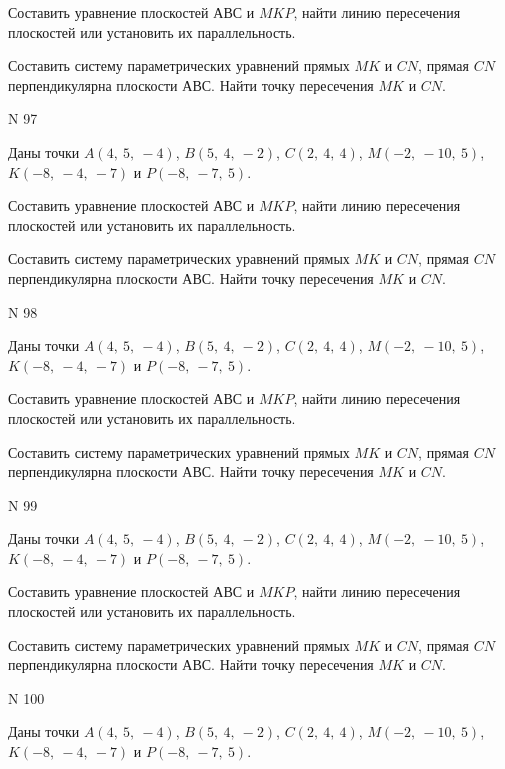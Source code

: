 \documentclass[11pt]{report}
\begin{document}
Составить уравнение плоскостей $АВС$ и $MKP$,
найти линию пересечения плоскостей или установить их параллельность.

Составить систему параметрических уравнений прямых $MK$ и $CN$,
прямая $CN$ перпендикулярна плоскости $АВС$. 
Найти точку пересечения $MK$ и $CN$.



 N 97

Даны точки $A\left( 4, \  5, \  -4\right)$, $B\left( 5, \  4, \  -2\right)$, $C\left( 2, \  4, \  4\right)$, $M\left( -2, \  -10, \  5\right)$, $K\left( -8, \  -4, \  -7\right)$ и $P\left( -8, \  -7, \  5\right)$.


Составить уравнение плоскостей $АВС$ и $MKP$,
найти линию пересечения плоскостей или установить их параллельность.

Составить систему параметрических уравнений прямых $MK$ и $CN$,
прямая $CN$ перпендикулярна плоскости $АВС$. 
Найти точку пересечения $MK$ и $CN$.



 N 98

Даны точки $A\left( 4, \  5, \  -4\right)$, $B\left( 5, \  4, \  -2\right)$, $C\left( 2, \  4, \  4\right)$, $M\left( -2, \  -10, \  5\right)$, $K\left( -8, \  -4, \  -7\right)$ и $P\left( -8, \  -7, \  5\right)$.


Составить уравнение плоскостей $АВС$ и $MKP$,
найти линию пересечения плоскостей или установить их параллельность.

Составить систему параметрических уравнений прямых $MK$ и $CN$,
прямая $CN$ перпендикулярна плоскости $АВС$. 
Найти точку пересечения $MK$ и $CN$.



 N 99

Даны точки $A\left( 4, \  5, \  -4\right)$, $B\left( 5, \  4, \  -2\right)$, $C\left( 2, \  4, \  4\right)$, $M\left( -2, \  -10, \  5\right)$, $K\left( -8, \  -4, \  -7\right)$ и $P\left( -8, \  -7, \  5\right)$.


Составить уравнение плоскостей $АВС$ и $MKP$,
найти линию пересечения плоскостей или установить их параллельность.

Составить систему параметрических уравнений прямых $MK$ и $CN$,
прямая $CN$ перпендикулярна плоскости $АВС$. 
Найти точку пересечения $MK$ и $CN$.



 N 100

Даны точки $A\left( 4, \  5, \  -4\right)$, $B\left( 5, \  4, \  -2\right)$, $C\left( 2, \  4, \  4\right)$, $M\left( -2, \  -10, \  5\right)$, $K\left( -8, \  -4, \  -7\right)$ и $P\left( -8, \  -7, \  5\right)$.
\end{document}
